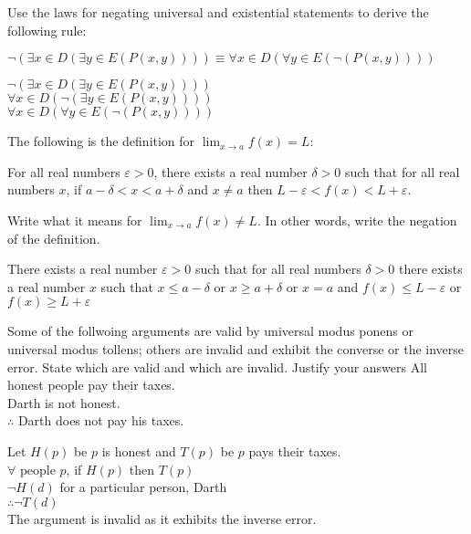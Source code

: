 \documentclass[12pt,letterpaper, onecolumn]{exam}
\begin{document}
\begin{questions}
\begin{solution}
	\end{solution}
	\question Use the laws for negating universal and existential statements to derive the following rule:
	\begin{center}
		$\neg (\exists x \in D(\exists y \in E(P(x,y)))) \equiv \forall x \in D(\forall y \in E(\neg(P(x,y))))$
	\end{center}
	\begin{solution}
		$\neg (\exists x \in D(\exists y \in E(P(x,y))))$\\
		$\forall x \in D(\neg(\exists y \in E(P(x,y))))$\\
		$\forall x \in D(\forall y \in E(\neg(P(x,y))))$
	\end{solution}
	\question The following is the definition for  $\lim_{x\to a} f(x) = L$: 
	\begin{center}
		For all real numbers $\varepsilon >0$, there exists a real number $\delta>0$ such that for all real numbers $x$, if $a-\delta < x < a+\delta$ and $x\neq a$ then $L-\varepsilon < f(x) < L+\varepsilon$.
	\end{center}
	Write what it means for  $\lim_{x\to a} f(x) \neq L$. In other words, write the negation of the definition.
	\begin{solution}
		There exists a real number $\varepsilon>0$ such that for all real numbers $\delta >0$ there exists a real number $x$ such that $x\leq a-\delta$ or $x\geq a+\delta$ or $x=a$ and $f(x)\leq L-\varepsilon$ or $f(x)\geq L+\varepsilon$
	\end{solution}
	Some of the follwoing arguments are valid by universal modus ponens or universal modus tollens; others are invalid and exhibit the converse or the inverse error. State which are valid and which are invalid. Justify your answers
	\question All honest people pay their taxes. \\
	Darth is not honest.\\
	$\therefore$ Darth does not pay his taxes.
	\begin{solution}
		Let $H(p)$ be $p$ is honest and $T(p)$ be $p$ pays their taxes.\\
		$\forall \textrm{ people } p$, if $H(p)$ then $T(p)$\\
		$\neg H(d)$ for a particular person, Darth\\
		$\therefore \neg T(d)$\\
		The argument is invalid as it exhibits the inverse error.
	\end{solution}
	

\end{questions}
\end{document}
